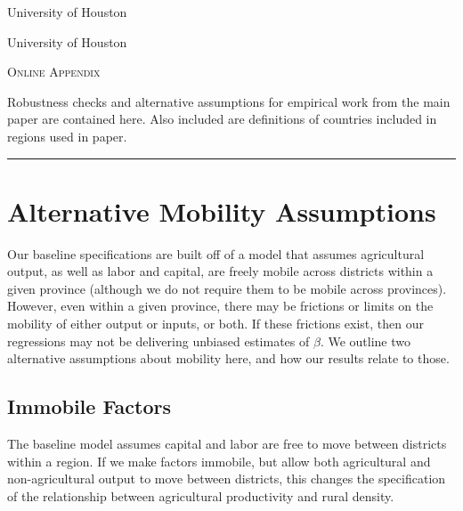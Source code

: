 \documentclass[11pt]{article}
\begin{document}
\begin{titlepage}
\vspace{2in} \noindent {\large \today}

\vspace{.5in} 

\vspace{.25in} 

\vspace{.05in} \noindent University of Houston

\vspace{.25in} 

\vspace{.05in} \noindent University of Houston

\vspace{2in} \noindent \textsc{Online Appendix} \hrulefill

\vspace{.05in} \noindent Robustness checks and alternative assumptions for empirical work from the main paper are contained here. Also included are definitions of countries included in regions used in paper. 
\vspace{.1in} \hrule

\end{titlepage}

\pagebreak 

\tableofcontents

\section{Alternative Mobility Assumptions}
Our baseline specifications are built off of a model that assumes agricultural output, as well as labor and capital, are freely mobile across districts within a given province (although we do not require them to be mobile across provinces). However, even within a given province, there may be frictions or limits on the mobility of either output or inputs, or both. If these frictions exist, then our regressions may not be delivering unbiased estimates of $\beta$. We outline two alternative assumptions about mobility here, and how our results relate to those. 

\subsection{Immobile Factors}
The baseline model assumes capital and labor are free to move between districts within a region. If we make factors immobile, but allow both agricultural and non-agricultural output to move between districts, this changes the specification of the relationship between agricultural productivity and rural density. 
\end{document}
